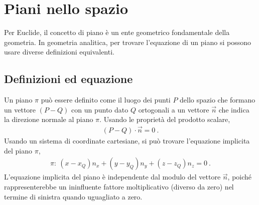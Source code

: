 \documentclass[letterpaper,10pt,english]{jupyterBook}
\begin{document}
\sphinxstepscope


\section{Piani nello spazio}
\label{\detokenize{ch/analytic_geometry/analytic_geometry_3d/planes:piani-nello-spazio}}\label{\detokenize{ch/analytic_geometry/analytic_geometry_3d/planes:geometry-analytic-3d-planes}}\label{\detokenize{ch/analytic_geometry/analytic_geometry_3d/planes::doc}}
\sphinxAtStartPar
Per Euclide, il concetto di piano è un ente geometrico fondamentale della geometria. In geometria analitica, per trovare l’equazione di un piano si possono usare diverse definizioni equivalenti.


\subsection{Definizioni ed equazione}
\label{\detokenize{ch/analytic_geometry/analytic_geometry_3d/planes:definizioni-ed-equazione}}\label{\detokenize{ch/analytic_geometry/analytic_geometry_3d/planes:geometry-analytic-3d-planes-def}}
\sphinxAtStartPar
{}
Un piano \(\pi\) può essere definito come il luogo dei punti \(P\) dello spazio che formano un vettore \((P-Q)\) con un punto dato \(Q\) ortogonali a un vettore \(\overrightarrow{n}\) che indica la direzione normale al piano \(\pi\). Usando le proprietà del prodotto scalare,
\begin{equation*}
\begin{split}(P-Q) \cdot \overrightarrow{n} = 0 \ .\end{split}
\end{equation*}
\sphinxAtStartPar
Usando un sistema di coordinate cartesiane, si può trovare l’equazione implicita del piano \(\pi\),
\begin{equation}\label{equation:ch/analytic_geometry/analytic_geometry_3d/planes:eq:geometry:analytic:3d:planes:def-1}
\begin{split}\pi: \ (x - x_Q) n_x + (y - y_Q) n_y + (z - z_Q) n_z = 0 \ .\end{split}
\end{equation}
\sphinxAtStartPar
{} L’equazione implicita del piano è independente dal modulo del vettore \(\vec{n}\), poiché rappresenterebbe un ininfluente fattore moltiplicativo (diverso da zero) nel termine di sinistra quando uguagliato a zero.
\end{document}
